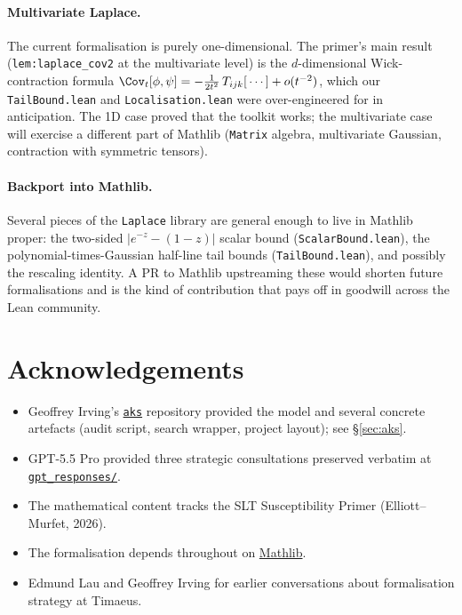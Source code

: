 \documentclass[11pt]{article}
\begin{document}
\paragraph{Multivariate Laplace.} The current formalisation is purely
one-dimensional. The primer's main result
(\texttt{lem:laplace\_cov2} at the multivariate level) is the
$d$-dimensional Wick-contraction formula
$\Cov_t[\phi,\psi] = -\frac{1}{2t^2}\,T_{ijk}[\,\cdots\,] + o(t^{-2})$,
which our \texttt{TailBound.lean} and \texttt{Localisation.lean} were
over-engineered for in anticipation. The 1D case proved that the toolkit
works; the multivariate case will exercise a different part of Mathlib
(\texttt{Matrix} algebra, multivariate Gaussian, contraction with
symmetric tensors).

\paragraph{Backport into Mathlib.} Several pieces of the
\texttt{Laplace} library are general enough to live in Mathlib proper:
the two-sided $|e^{-z} - (1-z)|$ scalar bound
(\texttt{ScalarBound.lean}), the polynomial-times-Gaussian half-line
tail bounds (\texttt{TailBound.lean}), and possibly the rescaling
identity. A PR to Mathlib upstreaming these would shorten future
formalisations and is the kind of contribution that pays off in
goodwill across the Lean community.

\section{Acknowledgements}

\begin{itemize}
\item Geoffrey Irving's \href{https://github.com/girving/aks}{\texttt{aks}}
repository provided the model and several concrete artefacts (audit
script, search wrapper, project layout); see \S\ref{sec:aks}.
\item GPT-5.5 Pro provided three strategic consultations preserved
verbatim at
\href{https://github.com/timaeus-research/laplace/tree/main/gpt_responses}{\texttt{gpt\_responses/}}.
\item The mathematical content tracks the SLT Susceptibility Primer
(Elliott--Murfet, 2026).
\item The formalisation depends throughout on
\href{https://github.com/leanprover-community/mathlib4}{Mathlib}.
\item Edmund Lau and Geoffrey Irving for earlier conversations about
formalisation strategy at Timaeus.
\end{itemize}
\end{document}

